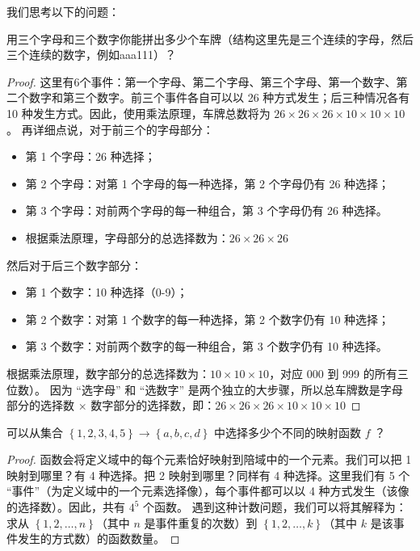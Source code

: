 \documentclass[lang=cn,math=mtpro2,11pt,scheme=chinese,pad]{elegantbook}
\begin{document}
我们思考以下的问题：
\begin{example}
  用三个字母和三个数字你能拼出多少个车牌（结构这里先是三个连续的字母，然后三个连续的数字，例如aaa111）？
\end{example}
\begin{proof}
  这里有6个事件：第一个字母、第二个字母、第三个字母、第一个数字、第二个数字和第三个数字。前三个事件各自可以以 26 种方式发生；后三种情况各有 10 种发生方式。因此，使用乘法原理，车牌总数将为 \(26 \times 26 \times 26 \times 10 \times 10 \times 10\)。
  再详细点说，对于前三个的字母部分：
  \begin{itemize}
    \item 第 1 个字母：26 种选择；
    \item 第 2 个字母：对第 1 个字母的每一种选择，第 2 个字母仍有 26 种选择；
    \item 第 3 个字母：对前两个字母的每一种组合，第 3 个字母仍有 26 种选择。
    \item 根据乘法原理，字母部分的总选择数为：\(26 \times 26 \times 26\)
  \end{itemize}
  然后对于后三个数字部分：
  \begin{itemize}
    \item 第 1 个数字：10 种选择（0-9）；
    \item 第 2 个数字：对第 1 个数字的每一种选择，第 2 个数字仍有 10 种选择；
    \item 第 3 个数字：对前两个数字的每一种组合，第 3 个数字仍有 10 种选择。
  \end{itemize}
  根据乘法原理，数字部分的总选择数为：\(10 \times 10 \times 10\)，对应 000 到 999 的所有三位数）。
  因为 “选字母” 和 “选数字” 是两个独立的大步骤，所以总车牌数是字母部分的选择数 \(\times\) 数字部分的选择数，即：\(26 \times 26 \times 26 \times 10 \times 10 \times 10\)
\end{proof}

\begin{example}
  可以从集合 \(\left\{ 1, 2, 3, 4, 5 \right\} \to \left\{ a, b, c, d \right\} \) 中选择多少个不同的映射函数 \(f\) ？
\end{example}
\begin{proof}
  函数会将定义域中的每个元素恰好映射到陪域中的一个元素。我们可以把 1 映射到哪里？有 4 种选择。把 2 映射到哪里？同样有 4 种选择。这里我们有 5 个 “事件”（为定义域中的一个元素选择像），每个事件都可以以 4 种方式发生（该像的选择数）。因此，共有 \(4^5\) 个函数。
  遇到这种计数问题，我们可以将其解释为：求从 \(\left\{ 1, 2, \dots, n \right\}\)（其中 \(n\) 是事件重复的次数）到 \(\left\{ 1, 2, \dots, k \right\}\)（其中 \(k\) 是该事件发生的方式数）的函数数量。
\end{proof}
\end{document}
